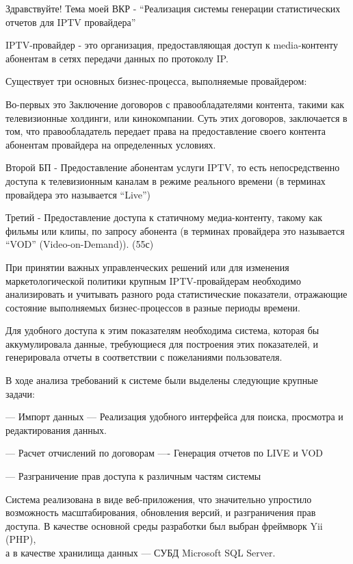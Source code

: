 \documentclass[a4paper]{article}
\begin{document}
\LARGE
\newpage

Здравствуйте!
Тема моей ВКР - “Реализация системы генерации статистических отчетов для IPTV провайдера”

\newpage
IPTV-провайдер - это организация, предоставляющая доступ к media-контенту абонентам в сетях передачи данных по протоколу IP.

Существует три основных бизнес-процесса, выполняемые провайдером:

Во-первых это Заключение договоров с правообладателями контента, такими как телевизионные холдинги, или кинокомпании. Суть этих договоров, заключается в том, что правообладатель передает права на предоставление своего контента абонентам провайдера на определенных условиях.

Второй БП -  Предоставление абонентам услуги IPTV, то есть непосредственно доступа к телевизионным каналам в режиме реального времени (в терминах провайдера это называется “Live”)

Третий - Предоставление доступа к статичному медиа-контенту, такому как фильмы или клипы, по запросу абонента (в терминах провайдера это называется “VOD” (Video-on-Demand)).
(55с)


\newpage

При принятии важных управленческих решений или для изменения маркетологической политики крупным IPTV-провайдерам необходимо анализировать и учитывать разного рода статистические показатели, отражающие состояние выполняемых бизнес-процессов в разные периоды времени.

Для удобного доступа к этим показателям необходима система, которая бы аккумулировала данные, требующиеся для построения этих показателей, и генерировала отчеты в соответствии с пожеланиями пользователя.

В ходе анализа требований к системе были выделены следующие крупные задачи:

--- Импорт данных
--- Реализация удобного интерфейса для поиска, просмотра и редактирования данных.

---  Расчет отчислений по договорам
---- Генерация отчетов по LIVE и VOD

---  Разграничение прав доступа к различным частям системы

\newpage

Система реализована в виде веб-приложения, что значительно упростило возможность масштабирования, обновления версий, и разграничения прав доступа.
В качестве основной среды разработки был выбран фреймворк Yii (PHP),\\
а в качестве хранилища данных --- СУБД Microsoft SQL Server.\\
\end{document}
